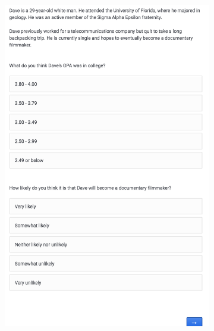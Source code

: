 \documentclass[12pt, letterpaper]{article}
\begin{document}
\begin{figure}[h!]
\begin{subfigure}[t]{0.48\textwidth}
	\includegraphics[width=1\textwidth]{../figs/vig_dave.png}
	\caption{}
\end{subfigure}
\end{figure}
\end{document}
